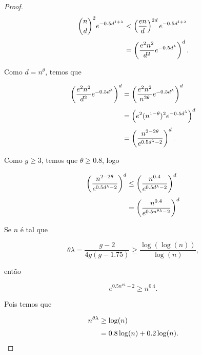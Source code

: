 \begin{proof}


\begin{equation*}
\setlength{\jot}{6pt}
\begin{aligned}
\binom{n}{d}^2e^{-0.5d^{1+\lambda}} &< \left(\frac{en}{d}\right)^{2d}e^{-0.5d^{1+\lambda}}\\ 
&= \left(\frac{e^2n^2}{d^2}e^{-0.5d^\lambda}\right)^d.
\end{aligned}
\end{equation*}

Como $d = n^\theta$, temos que

\begin{equation*}
\setlength{\jot}{6pt}
\begin{aligned}
\left(\frac{e^2n^2}{d^2}e^{-0.5d^\lambda}\right)^d 
&= \left(\frac{e^2n^2}{n^{2\theta}}e^{-0.5d^\lambda}\right)^d \\
&= \left(e^2(n^{1-\theta})^2e^{-0.5d^\lambda}\right)^d\\ 
&= \left(\frac{n^{2-2\theta}}{e^{0.5d^\lambda-2}}\right)^d. 
\end{aligned}
\end{equation*}

Como $g\geq 3$, temos que $\theta \geq 0.8$, logo

\begin{equation*}
\setlength{\jot}{6pt}
\begin{aligned}
\left(\frac{n^{2-2\theta}}{e^{0.5d^\lambda-2}}\right)^d 
&\leq \left(\frac{n^{0.4}}{e^{0.5d^\lambda-2}}\right)^d\\
&= \left(\frac{n^{0.4}}{e^{0.5n^{\theta\lambda}-2}}\right)^d
\end{aligned}
\end{equation*}

Se $n$ é tal que

\[\theta\lambda = \frac{g-2}{4g(g-1.75)} \geq \frac{\log(\log(n))}{\log(n)},\]

então 

\[e^{0.5n^{\theta\lambda}-2} \geq n^{0.4}.\]

Pois temos que

\begin{equation*}
\setlength{\jot}{6pt}
\begin{aligned}
n^{\theta\lambda} &\geq \log(n)\\
&= 0.8\log(n) + 0.2\log(n).
\end{aligned}
\end{equation*}


\end{proof}
